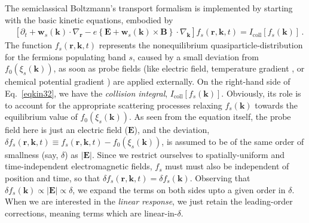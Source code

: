 \documentclass[aps,prb,onecolumn,nofootinbib,citeautoscript,10pt, showkeys]{revtex4-2}
\begin{document}
The semiclassical Boltzmann's transport formalism is implemented by starting with the basic kinetic equations, embodied by
\begin{align}
\label{eqkin32}
& \left [ \partial_t  
+ {\boldsymbol w}_s ({\boldsymbol k}) \cdot \nabla_{\boldsymbol r} 
-e \left \lbrace  \boldsymbol{E}
+  {\boldsymbol w}_s ({\boldsymbol k})  \times {\boldsymbol B} 
\right \rbrace  \cdot 
\nabla_{\boldsymbol k} \right ] f_s (\boldsymbol r, \boldsymbol k, t)
=  I_{\text{coll}} [f_s ({\boldsymbol k}) ]\,.
\end{align}
The function $f_s  (\boldsymbol r, \boldsymbol k, t) $ represents the nonequilibrium quasiparticle-distribution for the fermions populating band $s$, caused by a small deviation from $ f_0 (\xi_s(\boldsymbol k) ) $, as soon as probe fields (like electric field, temperature gradient \cite{ips-ruiz, ips-rsw-ph, ips-spin1-ph}, or chemical potential gradient \cite{ips-shreya}) are applied externally. On the right-hand side of Eq.~\eqref{eqkin32}, we have the \textit{collision integral}, $ I_{\text{coll}} [f_s ({\boldsymbol k}) ] $. Obviously, its role is to account for the appropriate scattering processes relaxing $f_s ({\boldsymbol k})$ towards the equilibrium value of $f_0 (\xi_s({\boldsymbol k}))$. 
As seen from the equation itself, the probe field here is just an electric field ($\boldsymbol E $), and the
deviation, $ \delta f_s  (\boldsymbol r, \boldsymbol k, t) \equiv 
f_s  (\boldsymbol r, \boldsymbol k, t) - f_0 (\xi_s (\boldsymbol k) ) $, is assumed to be of the same order of smallness (say, $\delta $) as $|\boldsymbol E|$. Since we restrict ourselves to spatially-uniform and time-independent electromagnetic fields, $f_s $ must must also be independent of position and time, so that $ \delta f_s  (\boldsymbol r, \boldsymbol k, t) = \delta f_s  (\boldsymbol k) $. Observing that $ \delta f_s  (\boldsymbol k) \propto |\boldsymbol E| \propto \delta $, we expand the terms on both sides upto a given order in $\delta $. When we are interested in the \textit{linear response}, we just retain the leading-order corrections, meaning terms which are linear-in-$\delta $. 
\end{document}
